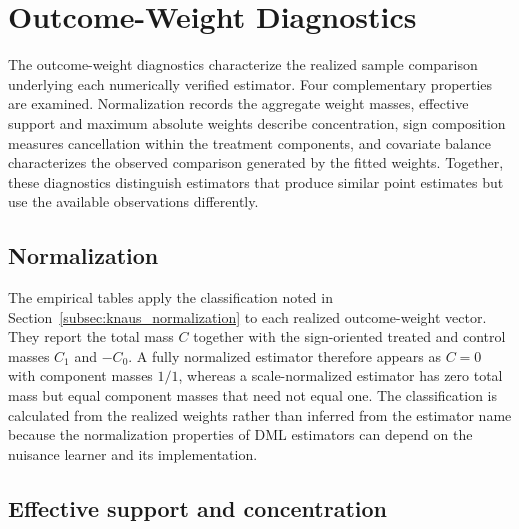 \documentclass[12pt, a4paper, oneside]{article}
\theoremstyle{plain}
\theoremstyle{definition}
\begin{document}
\section{Outcome-Weight Diagnostics}
\label{sec:outcome_weight_diagnostics}

The outcome-weight diagnostics characterize the realized sample comparison
underlying each numerically verified estimator. Four complementary properties
are examined. Normalization records the aggregate weight masses, effective
support and maximum absolute weights describe concentration, sign composition
measures cancellation within the treatment components, and covariate balance
characterizes the observed comparison generated by the fitted weights.
Together, these diagnostics distinguish estimators that produce similar point
estimates but use the available observations differently.



\subsection{Normalization}

The empirical tables apply the classification noted in
Section~\ref{subsec:knaus_normalization} to each realized outcome-weight
vector. They report the total mass \(C\) together with the sign-oriented
treated and control masses \(C_1\) and \(-C_0\). A fully normalized estimator
therefore appears as \(C=0\) with component masses \(1/1\), whereas a
scale-normalized estimator has zero total mass but equal component masses that
need not equal one. The classification is calculated from the realized
weights rather than inferred from the estimator name because the
normalization properties of DML estimators can depend on the nuisance learner
and its implementation.

\subsection{Effective support and concentration}
\label{subsec:effective_support}
\end{document}
